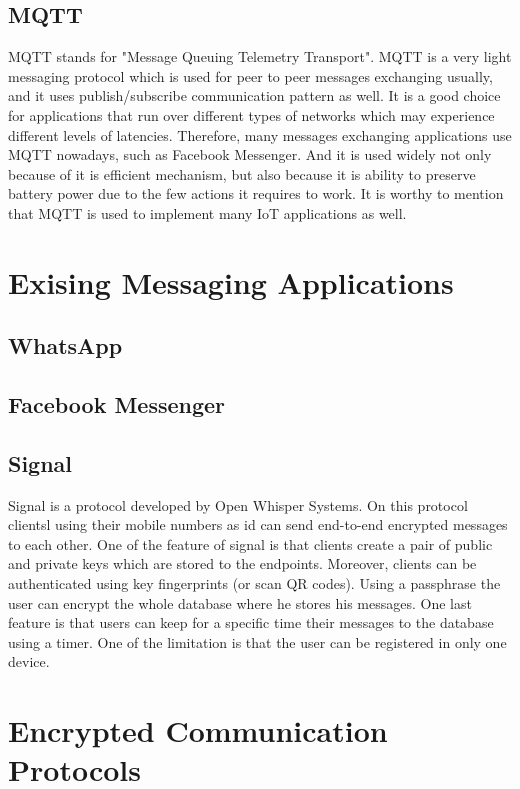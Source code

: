 \documentclass[11pt,a4paper]{report}
\begin{document}
\subsection{MQTT}
MQTT stands for "Message Queuing Telemetry Transport". MQTT is a very light messaging protocol which is used for peer to peer messages exchanging usually, and it uses publish/subscribe communication pattern as well. It is a good choice for applications that run over different types of networks which may experience different levels of latencies. Therefore, many messages exchanging applications use MQTT nowadays, such as Facebook Messenger. And it is used widely not only because of it is efficient mechanism, but also because it is ability to preserve battery power due to the few actions it requires to work. It is worthy to mention that MQTT is used to implement many IoT applications as well.

\section{Exising Messaging Applications}

\subsection{WhatsApp}

\subsection{Facebook Messenger}

\subsection{Signal}
Signal is a protocol developed by Open Whisper Systems. On this protocol clientsl using their mobile numbers as id can send end-to-end encrypted messages to each other. One of the feature of signal is that clients create a pair of public and private keys which are stored to the endpoints. Moreover, clients can be authenticated using key fingerprints (or scan QR codes). Using a passphrase the user can encrypt the whole database where he stores his messages. One last feature is that users can keep for a specific time their messages to the database using a timer. One of the limitation is that the user can be registered in only one device.

\section{Encrypted Communication Protocols}
\end{document}
